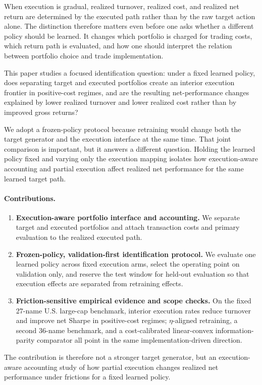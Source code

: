 \documentclass[10pt,twocolumn]{article}
\begin{document}
When execution is gradual, realized turnover, realized cost, and realized net return are determined by the executed path rather than by the raw target action alone. The distinction therefore matters even before one asks whether a different policy should be learned. It changes which portfolio is charged for trading costs, which return path is evaluated, and how one should interpret the relation between portfolio choice and trade implementation.

This paper studies a focused identification question: under a fixed learned policy, does separating target and executed portfolios create an interior execution frontier in positive-cost regimes, and are the resulting net-performance changes explained by lower realized turnover and lower realized cost rather than by improved gross returns?

We adopt a frozen-policy protocol because retraining would change both the target generator and the execution interface at the same time. That joint comparison is important, but it answers a different question. Holding the learned policy fixed and varying only the execution mapping isolates how execution-aware accounting and partial execution affect realized net performance for the same learned target path.

\paragraph{Contributions.}
\begin{enumerate}[leftmargin=*,itemsep=2pt]
\item \textbf{Execution-aware portfolio interface and accounting.} We separate target and executed portfolios and attach transaction costs and primary evaluation to the realized executed path.
\item \textbf{Frozen-policy, validation-first identification protocol.} We evaluate one learned policy across fixed execution arms, select the operating point on validation only, and reserve the test window for held-out evaluation so that execution effects are separated from retraining effects.
\item \textbf{Friction-sensitive empirical evidence and scope checks.} On the fixed 27-name U.S. large-cap benchmark, interior execution rates reduce turnover and improve net Sharpe in positive-cost regimes; $\eta$-aligned retraining, a second 36-name benchmark, and a cost-calibrated linear-convex information-parity comparator all point in the same implementation-driven direction.
\end{enumerate}
The contribution is therefore not a stronger target generator, but an execution-aware accounting study of how partial execution changes realized net performance under frictions for a fixed learned policy.
\end{document}
